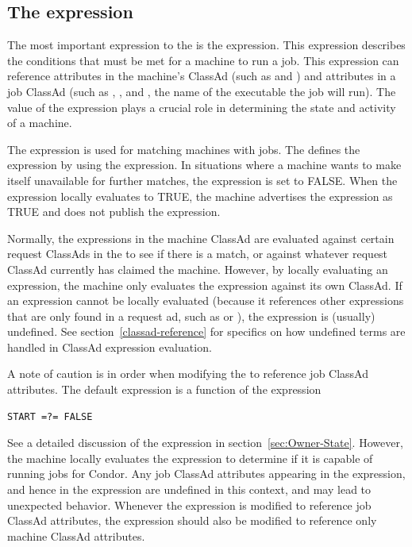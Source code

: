

\subsection{\label{sec:Start-Expr}
The  expression}

The most important expression to the 
is the  expression.  
This expression describes the conditions that must be met for a
machine to run a job. 
This expression can reference attributes
in the machine's ClassAd (such as  and )
and attributes in a job ClassAd (such as
, , and , the name of the
executable the job will run).
The value of the  expression plays a crucial role in
determining the state and activity of a machine.

The  expression is used for
matching machines with jobs.
The  defines the
 expression by using the  expression.
In situations where a machine wants to make itself
unavailable for further matches, the 
expression is set to FALSE.  
When the  expression locally evaluates to TRUE, the
machine advertises the  expression as TRUE and
does not publish the  expression.

Normally, the expressions in the machine ClassAd are evaluated against
certain request ClassAds in the  to see if there is
a match, or against whatever request ClassAd currently has claimed the
machine.  However, by locally evaluating an expression, the machine only
evaluates the expression against its own ClassAd.  If an expression
cannot be locally evaluated (because it references other expressions
that are only found in a request ad, such as  or
), the expression is (usually) undefined.
See section~\ref{classad-reference} for specifics on
how undefined terms are handled in ClassAd expression evaluation. 

A note of caution is in order when modifying the  to
reference job ClassAd attributes.  The default 
expression is a function of the  expression
\begin{verbatim}
START =?= FALSE
\end{verbatim}
See a detailed discussion of the  expression in
section~\ref{sec:Owner-State}.  However, the machine locally
evaluates the  expression to determine if it is
capable of running jobs for Condor.  Any job ClassAd attributes
appearing in the  expression, and hence in the
 expression are undefined in this context, and may
lead to unexpected behavior.  Whenever the  expression
is modified to reference job ClassAd attributes, the
 expression should also be modified to reference
only machine ClassAd attributes.

